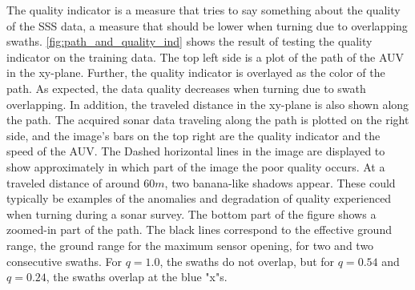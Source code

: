 The quality indicator is a measure that tries to say something about the quality of the SSS data, a measure that should be lower when turning due to overlapping swaths. \cref{fig:path_and_quality_ind} shows the result of testing the quality indicator on the training data. The top left side is a plot of the path of the AUV in the xy-plane. Further, the quality indicator is overlayed as the color of the path. As expected, the data quality decreases when turning due to swath overlapping. In addition, the traveled distance in the xy-plane is also shown along the path. The acquired sonar data traveling along the path is plotted on the right side, and the image's bars on the top right are the quality indicator and the speed of the AUV. The Dashed horizontal lines in the image are displayed to show approximately in which part of the image the poor quality occurs. At a traveled distance of around $60 m$, two banana-like shadows appear. These could typically be examples of the anomalies and degradation of quality experienced when turning during a sonar survey. The bottom part of the figure shows a zoomed-in part of the path. The black lines correspond to the effective ground range, the ground range for the maximum sensor opening, for two and two consecutive swaths. For $q = 1.0$, the swaths do not overlap, but for $q = 0.54$ and $q=0.24$, the swaths overlap at the blue "x"s. 

